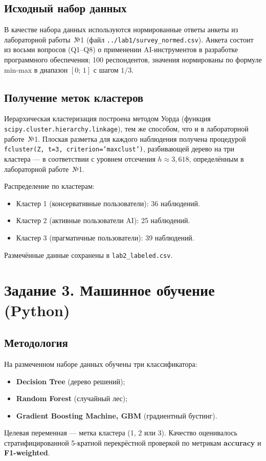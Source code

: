 \documentclass[12pt]{article}
\begin{document}
\subsection{Исходный набор данных}

В качестве набора данных используются нормированные ответы анкеты из
лабораторной работы~№1 (файл \texttt{../lab1/survey\_normed.csv}).  Анкета
состоит из восьми вопросов (Q1--Q8) о применении AI-инструментов в разработке
программного обеспечения; 100 респондентов, значения нормированы по формуле
min-max в диапазон $[0;\,1]$ с шагом $1/3$.

\subsection{Получение меток кластеров}

Иерархическая кластеризация построена методом Уорда (функция
\texttt{scipy.cluster.hierarchy.linkage}), тем же способом, что и в
лабораторной работе~№1.  Плоская разметка для каждого наблюдения получена
процедурой \texttt{fcluster(Z, t=3, criterion='maxclust')}, разбивающей
дерево на три кластера — в соответствии с уровнем отсечения
$h \approx 3{,}618$, определённым в лабораторной работе~№1.

Распределение по кластерам:
\begin{itemize}
  \item Кластер 1 (консервативные пользователи): 36 наблюдений.
  \item Кластер 2 (активные пользователи AI): 25 наблюдений.
  \item Кластер 3 (прагматичные пользователи): 39 наблюдений.
\end{itemize}

Размечённые данные сохранены в \texttt{lab2\_labeled.csv}.

\section{Задание 3. Машинное обучение (Python)}

\subsection{Методология}

На размеченном наборе данных обучены три классификатора:
\begin{itemize}
  \item \textbf{Decision Tree} (дерево решений);
  \item \textbf{Random Forest} (случайный лес);
  \item \textbf{Gradient Boosting Machine, GBM} (градиентный бустинг).
\end{itemize}
Целевая переменная — метка кластера (1, 2 или 3).  Качество оценивалось
стратифицированной 5-кратной перекрёстной проверкой по метрикам
\textbf{accuracy} и \textbf{F1-weighted}.
\end{document}
